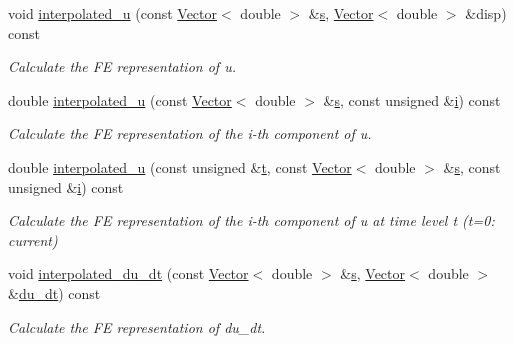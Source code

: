 \begin{DoxyCompactItemize}
\item 
void \hyperlink{classoomph_1_1AxisymmetricPoroelasticityEquations_a2ddb74516ff73b843bbc3994098bea30}{interpolated\+\_\+u} (const \hyperlink{classoomph_1_1Vector}{Vector}$<$ double $>$ \&\hyperlink{cfortran_8h_ab7123126e4885ef647dd9c6e3807a21c}{s}, \hyperlink{classoomph_1_1Vector}{Vector}$<$ double $>$ \&disp) const
\begin{DoxyCompactList}\small\item\em Calculate the FE representation of u. \end{DoxyCompactList}\item 
double \hyperlink{classoomph_1_1AxisymmetricPoroelasticityEquations_a3caa31f269c2877fb3f0502a7bcd2034}{interpolated\+\_\+u} (const \hyperlink{classoomph_1_1Vector}{Vector}$<$ double $>$ \&\hyperlink{cfortran_8h_ab7123126e4885ef647dd9c6e3807a21c}{s}, const unsigned \&\hyperlink{cfortran_8h_adb50e893b86b3e55e751a42eab3cba82}{i}) const
\begin{DoxyCompactList}\small\item\em Calculate the FE representation of the i-\/th component of u. \end{DoxyCompactList}\item 
double \hyperlink{classoomph_1_1AxisymmetricPoroelasticityEquations_ad5cf568a9cd222e58cfee4968da60df8}{interpolated\+\_\+u} (const unsigned \&\hyperlink{cfortran_8h_af6f0bd3dc13317f895c91323c25c2b8f}{t}, const \hyperlink{classoomph_1_1Vector}{Vector}$<$ double $>$ \&\hyperlink{cfortran_8h_ab7123126e4885ef647dd9c6e3807a21c}{s}, const unsigned \&\hyperlink{cfortran_8h_adb50e893b86b3e55e751a42eab3cba82}{i}) const
\begin{DoxyCompactList}\small\item\em Calculate the FE representation of the i-\/th component of u at time level t (t=0\+: current) \end{DoxyCompactList}\item 
void \hyperlink{classoomph_1_1AxisymmetricPoroelasticityEquations_aaab8e8f97840da4446dc4dd6949fc668}{interpolated\+\_\+du\+\_\+dt} (const \hyperlink{classoomph_1_1Vector}{Vector}$<$ double $>$ \&\hyperlink{cfortran_8h_ab7123126e4885ef647dd9c6e3807a21c}{s}, \hyperlink{classoomph_1_1Vector}{Vector}$<$ double $>$ \&\hyperlink{classoomph_1_1AxisymmetricPoroelasticityEquations_a5544e6c2ff2d40788b45a114ed1ccfd2}{du\+\_\+dt}) const
\begin{DoxyCompactList}\small\item\em Calculate the FE representation of du\+\_\+dt. \end{DoxyCompactList}\item 

\end{DoxyCompactItemize}

